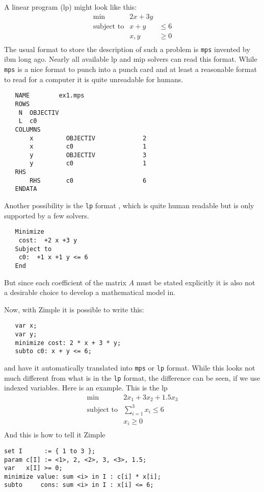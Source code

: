 \documentclass[12pt]{article}
\newcommand{\zimple}{{\sc Zimple}\xspace}
\newcommand{\lp}{{\sc lp}\xspace}
\newcommand{\mip}{{\sc mip}\xspace}
\newcommand{\mps}{{\tt mps}\xspace}
\newcommand{\lpf}{{\tt lp}\xspace}
\newcommand{\ibm}{{\sc ibm}\xspace}
\begin{document}
\medskip
A linear program (\lp) might look like this:
$$
\begin{array}{rll}
\min& 2 x + 3 y\\
\mbox{subject to}& x + y& \leq 6\\
&x,y&\ge 0\\
\end{array}
$$
The usual format to store the description of such a problem is \mps
invented by \ibm \cite{IBM97} long ago. 
Nearly all available \lp and \mip solvers can read this format.
While \mps is a nice format to punch into a punch card and at least a
reasonable format to read for a computer it is quite unreadable
for humans. 
{
\small
\begin{verbatim}
   NAME        ex1.mps
   ROWS
    N  OBJECTIV          
    L  c0                
   COLUMNS
       x         OBJECTIV             2
       x         c0                   1
       y         OBJECTIV             3
       y         c0                   1
   RHS
       RHS       c0                   6
   ENDATA
\end{verbatim}
}
Another possibility is the \lpf format \cite{ILO00}, which is quite
human readable but is only supported by a few solvers. 
{
\small
\begin{verbatim}
   Minimize
    cost:  +2 x +3 y
   Subject to
    c0:  +1 x +1 y <= 6
   End
\end{verbatim}
}
But since each coefficient of the matrix $A$ must be stated
explicitly it is also not a desirable choice to develop a mathematical
model in.

\medskip
Now, with \zimple it is possible to write this:
{\small
\begin{verbatim}
   var x;
   var y;
   minimize cost: 2 * x + 3 * y;
   subto c0: x + y <= 6;
\end{verbatim}
}
and have it automatically translated into \mps or \lpf format.
While this looks not much different from what is in the \lpf format,
the difference can be seen, if we use indexed variables.
Here is an example. This is the \lp 
$$
\begin{array}{rl}
\min& 2 x_1 + 3 x_2 + 1.5 x_3\\
\mbox{subject to}&\sum^3_{i=1} x_i \leq 6\\
&x_i\ge 0\\
\end{array}
$$
And this is how to tell it \zimple
{
\small
\begin{verbatim}
set I      := { 1 to 3 };
param c[I] := <1>, 2, <2>, 3, <3>, 1.5;
var   x[I] >= 0;
minimize value: sum <i> in I : c[i] * x[i];
subto     cons: sum <i> in I : x[i] <= 6;
\end{verbatim}
}
\end{document}
